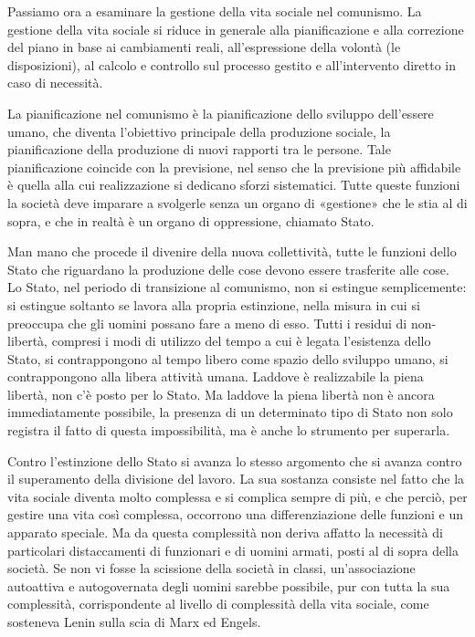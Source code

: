 \documentclass[../main]{subfiles}
\begin{document}
Passiamo ora a esaminare la gestione della vita sociale nel comunismo. La gestione della vita sociale si riduce in generale alla pianificazione e alla correzione del piano in base ai cambiamenti reali, all'espressione della volontà (le disposizioni), al calcolo e controllo sul processo gestito e all'intervento diretto in caso di necessità.

La pianificazione nel comunismo è la pianificazione dello sviluppo dell'essere umano, che diventa l'obiettivo principale della produzione sociale, la pianificazione della produzione di nuovi rapporti tra le persone. Tale pianificazione coincide con la previsione, nel senso che la previsione più affidabile è quella alla cui realizzazione si dedicano sforzi sistematici. Tutte queste funzioni la società deve imparare a svolgerle senza un organo di «gestione» che le stia al di sopra, e che in realtà è un organo di oppressione, chiamato Stato.

Man mano che procede il divenire della nuova collettività, tutte le funzioni dello Stato che riguardano la produzione delle cose devono essere trasferite alle cose. Lo Stato, nel periodo di transizione al comunismo, non si estingue semplicemente: si estingue soltanto se lavora alla propria estinzione, nella misura in cui si preoccupa che gli uomini possano fare a meno di esso. Tutti i residui di non-libertà, compresi i modi di utilizzo del tempo a cui è legata l'esistenza dello Stato, si contrappongono al tempo libero come spazio dello sviluppo umano, si contrappongono alla libera attività umana. Laddove è realizzabile la piena libertà, non c'è posto per lo Stato. Ma laddove la piena libertà non è ancora immediatamente possibile, la presenza di un determinato tipo di Stato non solo registra il fatto di questa impossibilità, ma è anche lo strumento per superarla.

Contro l'estinzione dello Stato si avanza lo stesso argomento che si avanza contro il superamento della divisione del lavoro. La sua sostanza consiste nel fatto che la vita sociale diventa molto complessa e si complica sempre di più, e che perciò, per gestire una vita così complessa, occorrono una differenziazione delle funzioni e un apparato speciale. Ma da questa complessità non deriva affatto la necessità di particolari distaccamenti di funzionari e di uomini armati, posti al di sopra della società. Se non vi fosse la scissione della società in classi, un'associazione autoattiva e autogovernata degli uomini sarebbe possibile, pur con tutta la sua complessità, corrispondente al livello di complessità della vita sociale, come sosteneva Lenin sulla scia di Marx ed Engels.
\end{document}
